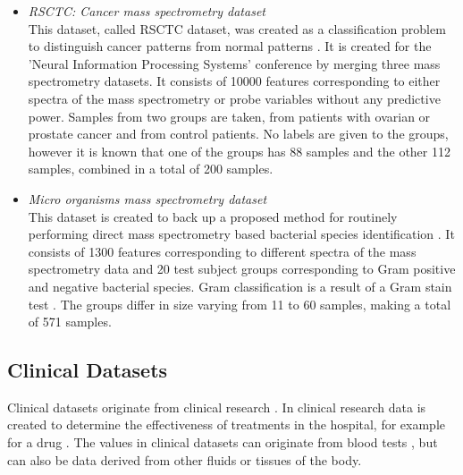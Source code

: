 \documentclass[10pt,a4paper]{report}
\begin{document}
	\begin{itemize}
		\item \textit{RSCTC: Cancer mass spectrometry dataset} \\ This dataset, called RSCTC dataset, was created as a classification problem to distinguish cancer patterns from normal patterns \cite{NIPS2004_2728}. It is created for the 'Neural Information Processing Systems' conference by merging three mass spectrometry datasets. It consists of 10000 features corresponding to either spectra of the mass spectrometry or probe variables without any predictive power. Samples from two groups are taken, from patients with ovarian or prostate cancer and from control patients. No labels are given to the groups, however it is known that one of the groups has 88 samples and the other 112 samples, combined in a total of 200 samples.
		\item \textit{Micro organisms mass spectrometry dataset} \\ This dataset is created to back up a proposed method for routinely performing direct mass spectrometry based bacterial species identification \cite{doi:10.1093/bioinformatics/btu022}. It consists of 1300 features corresponding to different spectra of the mass spectrometry data and 20 test subject groups corresponding to Gram positive and negative bacterial species. Gram classification is a result of a Gram stain test \cite{madigan2017brock}. The groups differ in size varying from 11 to 60 samples, making a total of 571 samples.
	\end{itemize}
		
	
	\subsection{Clinical Datasets}
	\label{PLsubsec:Clinical}
	
	Clinical datasets originate from clinical research \cite{liu2012data, sittig2008grand}. In clinical research data is created to determine the effectiveness of treatments in the hospital, for example for a drug \cite{pocock2013clinical}. The values in clinical datasets can originate from blood tests \cite{bendele1999efficacy}, but can also be data derived from other fluids or tissues of the body.  
	
\end{document}
